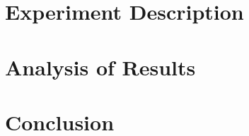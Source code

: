 \documentclass[journal,draftclsnofoot]{IEEEtran}
\begin{document}
\section{Experiment Description}\label{desc}
\section{Analysis of Results}\label{ana}
\section{Conclusion}\label{conc}


\cleardoublepage
\onecolumn
\end{document}
